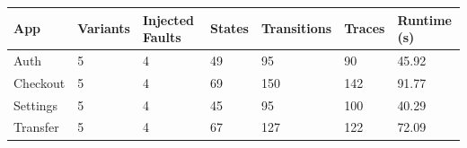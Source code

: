 \begin{tabular}{lllllll}
\toprule
App & Variants & Injected Faults & States & Transitions & Traces & Runtime (s) \\
\midrule
Auth & 5 & 4 & 49 & 95 & 90 & 45.92 \\
Checkout & 5 & 4 & 69 & 150 & 142 & 91.77 \\
Settings & 5 & 4 & 45 & 95 & 100 & 40.29 \\
Transfer & 5 & 4 & 67 & 127 & 122 & 72.09 \\
\bottomrule
\end{tabular}
